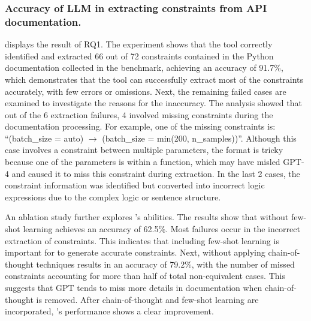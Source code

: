 \subsubsection{Accuracy of LLM in extracting constraints from API documentation.}
 displays the result of RQ1. The experiment shows that the tool correctly identified and extracted 66 out of 72 constraints contained in the Python documentation collected in the benchmark, achieving an accuracy of 91.7\%, which demonstrates that the tool can successfully extract most of the constraints accurately, with few errors or omissions.
Next, the remaining failed cases are examined to investigate the reasons for the inaccuracy. The analysis showed that out of the 6 extraction failures, 4 involved missing constraints during the documentation processing. For example, one of the missing constraints is: ``(batch\_size = auto) $\rightarrow$ (batch\_size = min(200, n\_samples))''. Although this case involves a constraint between multiple parameters, the format is tricky because one of the parameters is within a function, which may have misled GPT-4 and caused it to miss this constraint during extraction. In the last 2 cases, the constraint information was identified but converted into incorrect logic expressions due to the complex logic or sentence structure.

An ablation study further explores \toolchecker's abilities. The results show that \toolchecker without few-shot learning achieves an accuracy of 62.5\%. Most failures occur in the incorrect extraction of constraints. This indicates that including few-shot learning is important for \toolchecker to generate accurate constraints.
Next, \toolchecker without applying chain-of-thought techniques results in an accuracy of 79.2\%, with the number of missed constraints accounting for more than half of total non-equivalent cases. This suggests that GPT tends to miss more details in documentation when chain-of-thought is removed.
After chain-of-thought and few-shot learning are incorporated, \toolchecker's performance shows a clear improvement.

